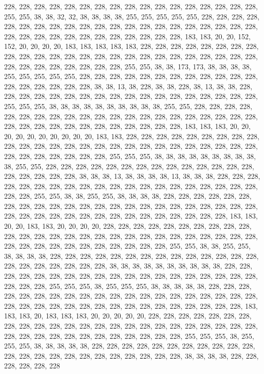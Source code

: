 {	228, 228, 228, 228, 228, 228, 228, 228, 228, 228, 228, 228, 228, 228, 228, 228, 228, 255, 255, 38,  38,  32,  32,  38,  38,  38,  38,  255, 255, 255, 255, 255, 228, 228, 228, 228, 228, 228, 228, 228, 228, 228, 228, 228, 228, 228, 228, 228, 228, 228, 228, 228, 228, 228, 228, 228, 228, 228, 228, 228, 228, 228, 228, 228, 228, 183, 183, 20,  20,  152, 152, 20,  20,  20,  20,  183, 183, 183, 183, 183, 228, 228, 228, 228, 228, 228, 228, 228, 228, 228, 228, 228, 228, 228, 228, 228, 228, 228, 228, 228, 228, 228, 228, 228, 228, 228, 228, 228, 228, 228, 228, 228, 228, 255, 255, 38,  38,  173, 173, 38,  38,  38,  38,  255, 255, 255, 255, 255, 228, 228, 228, 228, 228, 228, 228, 228, 228, 228, 228, 228, 228, 228, 228, 228, 228, 228, 38,  38,  13,  38,  228, 38,  38,  228, 38,  13,  38,  38,  228, 228, 
	228, 228, 228, 228, 228, 228, 228, 228, 228, 228, 228, 228, 228, 228, 228, 228, 255, 255, 255, 38,  38,  38,  38,  38,  38,  38,  38,  38,  38,  255, 255, 228, 228, 228, 228, 228, 228, 228, 228, 228, 228, 228, 228, 228, 228, 228, 228, 228, 228, 228, 228, 228, 228, 228, 228, 228, 228, 228, 228, 228, 228, 228, 228, 228, 183, 183, 183, 20,  20,  20,  20,  20,  20,  20,  20,  20,  20,  183, 183, 228, 228, 228, 228, 228, 228, 228, 228, 228, 228, 228, 228, 228, 228, 228, 228, 228, 228, 228, 228, 228, 228, 228, 228, 228, 228, 228, 228, 228, 228, 228, 228, 228, 255, 255, 255, 38,  38,  38,  38,  38,  38,  38,  38,  38,  38,  255, 255, 228, 228, 228, 228, 228, 228, 228, 228, 228, 228, 228, 228, 228, 228, 228, 228, 228, 228, 228, 38,  38,  38,  13,  38,  38,  38,  38,  13,  38,  38,  38,  228, 228, 
	228, 228, 228, 228, 228, 228, 228, 228, 228, 228, 228, 228, 228, 228, 228, 228, 228, 228, 228, 228, 255, 255, 38,  38,  255, 255, 38,  38,  38,  38,  228, 228, 228, 228, 228, 228, 228, 228, 228, 228, 228, 228, 228, 228, 228, 228, 228, 228, 228, 228, 228, 228, 228, 228, 228, 228, 228, 228, 228, 228, 228, 228, 228, 228, 228, 228, 228, 228, 183, 183, 20,  20,  183, 183, 20,  20,  20,  20,  228, 228, 228, 228, 228, 228, 228, 228, 228, 228, 228, 228, 228, 228, 228, 228, 228, 228, 228, 228, 228, 228, 228, 228, 228, 228, 228, 228, 228, 228, 228, 228, 228, 228, 228, 228, 228, 228, 255, 255, 38,  38,  255, 255, 38,  38,  38,  38,  228, 228, 228, 228, 228, 228, 228, 228, 228, 228, 228, 228, 228, 228, 228, 228, 228, 228, 228, 228, 228, 38,  38,  38,  38,  38,  38,  38,  38,  38,  38,  228, 228, 228, 
	228, 228, 228, 228, 228, 228, 228, 228, 228, 228, 228, 228, 228, 228, 228, 228, 228, 228, 228, 255, 255, 255, 38,  255, 255, 255, 38,  38,  38,  38,  38,  228, 228, 228, 228, 228, 228, 228, 228, 228, 228, 228, 228, 228, 228, 228, 228, 228, 228, 228, 228, 228, 228, 228, 228, 228, 228, 228, 228, 228, 228, 228, 228, 228, 228, 228, 228, 183, 183, 183, 20,  183, 183, 183, 20,  20,  20,  20,  20,  228, 228, 228, 228, 228, 228, 228, 228, 228, 228, 228, 228, 228, 228, 228, 228, 228, 228, 228, 228, 228, 228, 228, 228, 228, 228, 228, 228, 228, 228, 228, 228, 228, 228, 228, 228, 255, 255, 255, 38,  255, 255, 255, 38,  38,  38,  38,  38,  228, 228, 228, 228, 228, 228, 228, 228, 228, 228, 228, 228, 228, 228, 228, 228, 228, 228, 228, 228, 228, 228, 228, 38,  38,  38,  38,  228, 228, 228, 228, 228, 228 
}